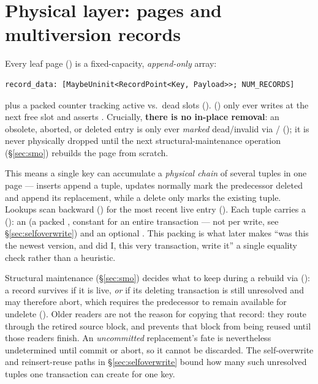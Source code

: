 \documentclass[11pt]{article}
\begin{document}
\section{Physical layer: pages and multiversion records}
\label{sec:physical}

Every leaf page () is a fixed-capacity,
\emph{append-only} array:
\begin{lstlisting}
record_data: [MaybeUninit<RecordPoint<Key, Payload>>; NUM_RECORDS]
\end{lstlisting}
plus a packed  counter tracking active vs.\ dead slots
().  ()
only ever writes at the next free slot and asserts . Crucially,
\textbf{there is no in-place removal}: an obsolete, aborted, or deleted entry is only ever
\emph{marked} dead/invalid via /
(); it is never physically dropped until
the next structural-maintenance operation (\S\ref{sec:smo}) rebuilds the page from
scratch.

This means a single key can accumulate a \emph{physical chain} of several
 tuples in one page --- inserts append a tuple, updates normally mark
the predecessor deleted and append its replacement, while a delete only marks the
existing tuple. Lookups scan backward () for the most recent live entry
(). Each tuple carries a 
(): an  (a packed
, constant for an entire transaction --- not per write, see
\S\ref{sec:selfoverwrite}) and an optional . This packing is what
later makes ``was this the newest version, and did I, this very transaction, write it''
a single equality check rather than a heuristic.

Structural maintenance (\S\ref{sec:smo}) decides what to keep during a rebuild via
 (): a record survives if it is
live, \emph{or} if its deleting transaction is still unresolved and may therefore abort,
which requires the predecessor to remain available for undelete
(). Older readers are not the reason for copying that record:
they route through the retired source block, and  prevents that
block from being reused until those readers finish. An \emph{uncommitted} replacement's
fate is nevertheless undetermined until commit or abort, so it cannot be discarded.
The self-overwrite and reinsert-reuse paths in \S\ref{sec:selfoverwrite} bound how many
such unresolved tuples one transaction can create for one key.
\end{document}
